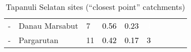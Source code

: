 \begin{table}[ht]
\begin{tabular}{C{0.05\textwidth}C{0.15\textwidth}C{0.08\textwidth}C{0.08\textwidth}C{0.08\textwidth}C{0.08\textwidth}C{0.08\textwidth}C{0.08\textwidth}C{0.08\textwidth}C{0.08\textwidth}}
  {-} & Danau Marsabut &   7 & \textcolor[HTML]{000000}{0.56} & \textcolor[HTML]{000000}{0.23} & \textcolor[HTML]{FFFFFF}{4} &  &  &  &  \\ 
  {-} & Pargarutan &  11 & \textcolor[HTML]{000000}{0.42} & \textcolor[HTML]{000000}{0.17} & \textcolor[HTML]{000000}{3} &  &  &  &  \\ 
  \end{tabular}
\endgroup
\caption{Tapanuli Selatan sites (``closest point'' catchments)} 
\end{table}
